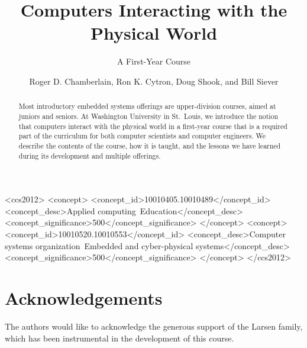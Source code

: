 \documentclass[sigconf]{acmart}
\begin{document}
\title{Computers Interacting with the Physical World}
\subtitle{A First-Year Course}


\author{Roger D. Chamberlain, Ron K. Cytron, Doug Shook, and Bill Siever}


\renewcommand{\shortauthors}{R. D. Chamberlain et al.}

\newcommand{\FIXME}[1]{\textcolor{red}{FIXME: #1}}

\begin{abstract}
Most introductory embedded systems offerings are upper-division courses,
aimed at juniors and seniors.  At Washington University in St.~Louis, we
introduce the notion that computers interact with the physical world
in a first-year course that is a required part of the
curriculum for both computer scientists and computer engineers.
We describe the contents of the course, how it is taught, and
the lessons we have learned during its development and multiple
offerings.
\end{abstract}

%
%
 \begin{CCSXML}
<ccs2012>
<concept>
<concept_id>10010405.10010489</concept_id>
<concept_desc>Applied computing~Education</concept_desc>
<concept_significance>500</concept_significance>
</concept>
<concept>
<concept_id>10010520.10010553</concept_id>
<concept_desc>Computer systems organization~Embedded and cyber-physical systems</concept_desc>
<concept_significance>500</concept_significance>
</concept>
</ccs2012>
\end{CCSXML}





\maketitle








\section*{Acknowledgements}
The authors would like to acknowledge
the generous support of the Larsen family, which has been instrumental
in the development of this course.



\end{document}
